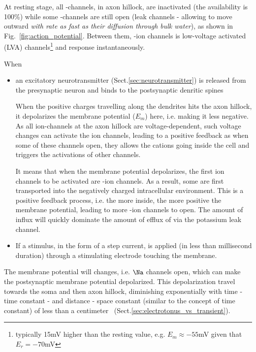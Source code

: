 At resting stage, all -channels, in axon hillock, are inactivated (the
availability is 100\%) while some -channels are still open (leak channels
- allowing  to move outward {\it with rate as fast as their diffusion
through bulk water}), as shown in Fig.~\ref{fig:action_potential}. Between them,
-ion channels is low-voltage activated (LVA) channels\footnote{typically
15mV higher than the resting value,
  e.g. $E_m\approx -55$mV given that $E_r=-70$mV}
and response instantaneously. 


When 
\begin{itemize}
  \item an excitatory neurotransmitter (Sect.\ref{sec:neurotransmitter}) is
  released from the presynaptic neuron and binds to the postsynaptic denritic
  spines

When the positive charges travelling along the dendrites hits the axon hillock,
it depolarizes the membrane potential ($E_m$) here, i.e. making it
less negative.  As all ion-channels at the axon hillock are
voltage-dependent, such voltage changes can activate the ion channels,
leading to a positive feedback as when some of these channels open,
they allows the cations going inside the cell and triggers the
activations of other channels.
  
It means that when the membrane potential depolarizes, the first ion channels to
be activated are -ion channels.
As a result, some  are first transported into the negatively charged
intracellular environment. This is a positive feedback process, i.e. the more
 inside, the more positive the membrane potential, leading to more
-ion channels to open. The amount of influx  will quickly
dominate the amount of efflux of  via the potassium leak channel.
  
  \item If a stimulus, in the form of a step current, is applied (in less than
millisecond duration) through a stimulating electrode touching the
membrane. 
\end{itemize}
The membrane potential will changes, i.e. $\Na$ channels open, which can make
the postsynaptic membrane potential depolarized. This depolarization travel
towards the soma and then axon hillock, diminishing exponentially with time -
time constant - and distance - space constant 
(similar to the concept of time constant) of less than a
centimeter~\cite{fitzhugh1969mmc} (Sect.\ref{sec:electrotonus_vs_transient}).

